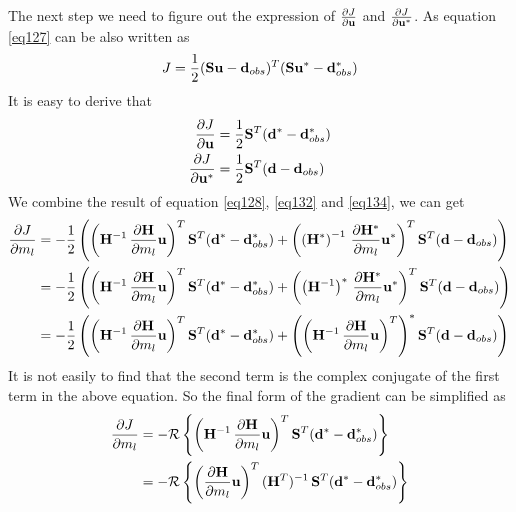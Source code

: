 \documentclass[revised,endfloat]{geophysics}
\begin{document}
The next step we need to figure out the expression of $\frac{\partial J}{\partial {\bf u}}$ and $\frac{\partial J}{\partial {\bf u}^*}$. As equation \ref{eq127} can be also written as
\begin{equation}
J = \frac{1}{2}({\bf S}{\bf u} - {\bf d}_{obs})^T ({\bf S}{\bf u}^* - {\bf d}_{obs}^*)
\label{eq133}
\end{equation}
It is easy to derive that
\begin{equation}
\begin{split}
\frac{\partial J}{\partial {\bf u}} & = \frac{1}{2} {\bf S}^T ({\bf d}^* - {\bf d}_{obs}^*) \\
\frac{\partial J}{\partial {\bf u}^*} & = \frac{1}{2} {\bf S}^T ({\bf d} - {\bf d}_{obs}) \\
\end{split}
\label{eq134}
\end{equation}
We combine the result of equation \ref{eq128}, \ref{eq132} and \ref{eq134}, we can get
\begin{equation}
\begin{split}
\frac{\partial J}{\partial m_l} &= -\frac{1}{2} \left(    \left({\bf H}^{-1} \,\frac{\partial {\bf H}}{\partial m_l} {\bf u}\right)^T {\bf S}^T ({\bf d}^* - {\bf d}_{obs}^*)  + \left( \left({\bf H}^*\right)^{-1}  \, \frac{\partial {\bf H}^*}{\partial m_l} {\bf u}^*\right)^T  {\bf S}^T ({\bf d} - {\bf d}_{obs})   \right) \\
 &= -\frac{1}{2} \left(    \left({\bf H}^{-1} \,\frac{\partial {\bf H}}{\partial m_l} {\bf u}\right)^T {\bf S}^T ({\bf d}^* - {\bf d}_{obs}^*)  + \left( \left({\bf H}^{-1}\right)^*  \, \frac{\partial {\bf H}^*}{\partial m_l} {\bf u}^*\right)^T  {\bf S}^T ({\bf d} - {\bf d}_{obs})   \right) \\
  &= -\frac{1}{2} \left(    \left({\bf H}^{-1} \,\frac{\partial {\bf H}}{\partial m_l} {\bf u}\right)^T {\bf S}^T ({\bf d}^* - {\bf d}_{obs}^*)  + \left( \left( {\bf H}^{-1}  \, \frac{\partial {\bf H}}{\partial m_l} {\bf u} \right)^T \right)^* {\bf S}^T ({\bf d} - {\bf d}_{obs})   \right)
\end{split}
\label{eq135}
\end{equation}
It is not easily to find that the second term is the complex conjugate of the first term in the above equation. So the final form of the gradient can be simplified as
\begin{equation}
\begin{split}
\frac{\partial J}{\partial m_l} &= -{\mathcal R} \left\{    \left({\bf H}^{-1} \,\frac{\partial {\bf H}}{\partial m_l} {\bf u}\right)^T {\bf S}^T ({\bf d}^* - {\bf d}_{obs}^*)  \right\} \\
&= -{\mathcal R} \left\{  \left( \frac{\partial {\bf H}}{\partial m_l} {\bf u} \right)^T  ({\bf H}^T)^{-1} \,    {\bf S}^T ({\bf d}^* - {\bf d}_{obs}^*)  \right\} \\
\end{split}
\label{eq136}
\end{equation}
\end{document}
